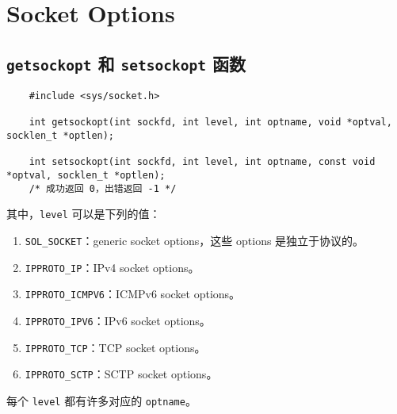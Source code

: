 \section{Socket Options}

  \subsection{\texttt{getsockopt} 和 \texttt{setsockopt} 函数}

    \begin{verbatim}
    #include <sys/socket.h>
    
    int getsockopt(int sockfd, int level, int optname, void *optval, socklen_t *optlen);

    int setsockopt(int sockfd, int level, int optname, const void *optval, socklen_t *optlen);
    /* 成功返回 0，出错返回 -1 */
    \end{verbatim}

    其中，\texttt{level} 可以是下列的值：

    \begin{enumerate}
      \item \texttt{SOL\_SOCKET}：generic socket options，这些 options 是独立于协议的。
      \item \texttt{IPPROTO\_IP}：IPv4 socket options。
      \item \texttt{IPPROTO\_ICMPV6}：ICMPv6 socket options。
      \item \texttt{IPPROTO\_IPV6}：IPv6 socket options。
      \item \texttt{IPPROTO\_TCP}：TCP socket options。
      \item \texttt{IPPROTO\_SCTP}：SCTP socket options。
    \end{enumerate}

    每个 \texttt{level} 都有许多对应的 \texttt{optname}。